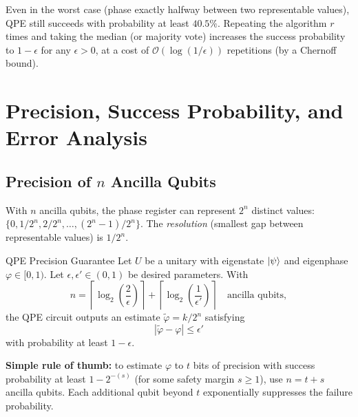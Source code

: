 \documentclass[12pt,a4paper]{article}
\newcommand{\QPE}{\textsc{QPE}}
\newcommand{\bigO}{\mathcal{O}}
\begin{document}
\begin{tcolorbox}[insight]
  Even in the worst case (phase exactly halfway between two representable
  values), \QPE{} still succeeds with probability at least $40.5\%$.
  Repeating the algorithm $r$ times and taking the median (or majority
  vote) increases the success probability to $1-\epsilon$ for any $\epsilon>0$,
  at a cost of $\bigO(\log(1/\epsilon))$ repetitions (by a Chernoff bound).
\end{tcolorbox}

\newpage

\section{Precision, Success Probability, and Error Analysis}
\label{sec:precision}

\subsection{Precision of \texorpdfstring{$n$}{n} Ancilla Qubits}

With $n$ ancilla qubits, the phase register can represent $2^n$ distinct
values: $\{0, 1/2^n, 2/2^n, \ldots, (2^n-1)/2^n\}$.  The \emph{resolution}
(smallest gap between representable values) is $1/2^n$.

\begin{theorem}{QPE Precision Guarantee}{}
  Let $U$ be a unitary with eigenstate $\Ket{\psi}$ and eigenphase
  $\varphi\in[0,1)$.  Let $\epsilon, \epsilon' \in (0,1)$ be desired
  parameters.  With
  \[
    n = \left\lceil\log_2\!\left(\frac{2}{\epsilon}\right)\right\rceil
    + \left\lceil\log_2\!\left(\frac{1}{\epsilon'}\right)\right\rceil
    \quad\text{ancilla qubits},
  \]
  the \QPE{} circuit outputs an estimate $\tilde\varphi = k/2^n$ satisfying
  \[
    |\tilde\varphi - \varphi| \leq \epsilon'
  \]
  with probability at least $1 - \epsilon$.
\end{theorem}

\medskip

\textbf{Simple rule of thumb:} to estimate $\varphi$ to $t$ bits of precision
with success probability at least $1 - 2^{-(s)}$ (for some safety margin
$s \geq 1$), use $n = t + s$ ancilla qubits.  Each additional qubit beyond $t$
exponentially suppresses the failure probability.
\end{document}
